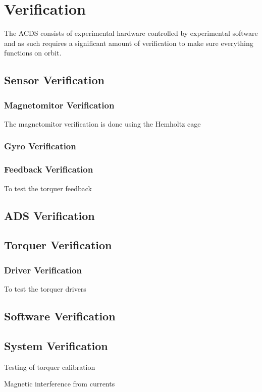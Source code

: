 
\chapter{Verification}

\label{ch:Verification}

The \ac{ACDS} consists of experimental hardware controlled by experimental software and as such requires a significant amount of verification to make sure everything functions on orbit.

\section{Sensor Verification}

\subsection{Magnetomitor Verification}

The magnetomitor verification is done using the Hemholtz cage 

\subsection{Gyro Verification}

\subsection{Feedback Verification}

To test the torquer feedback 

\section{\acl{ADS} Verification}

\section{Torquer Verification}

\subsection{Driver Verification}

To test the torquer drivers 


\section{Software Verification}

\section{System Verification}

Testing of torquer calibration

Magnetic interference from currents


